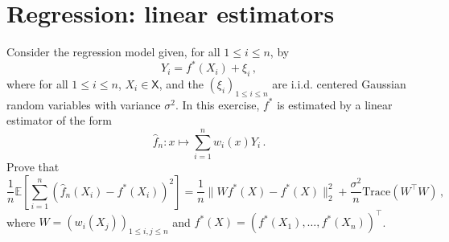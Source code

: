 \documentclass[a4paper,10pt,fleqn]{article}
\newcommand{\eqsp}{\,}
\newcommand{\xset}{\ensuremath{\mathsf{X}}}
\newcommand{\1}{\ensuremath{\mathbbm{1}}}
\newcommand{\bE}{\mathbb{E}}
\begin{document}
\section*{Regression: linear estimators}
Consider the regression model given, for all $1\leqslant i\leqslant n$, by
$$
Y_{i}=f^*(X_{i})+\xi_{i}\eqsp,
$$
where for all $1\leqslant i\leqslant n$, $X_i\in\xset$, and the $(\xi_{i})_{1\leqslant i \leqslant n}$ are i.i.d. centered Gaussian random variables with variance $\sigma^2$. In this exercise, $f^*$ is estimated by a linear estimator of the form
$$
\widehat f_n: x \mapsto \sum_{i = 1}^n w_i(x)Y_i\eqsp.
$$
Prove that
$$
\frac{1}{n}\bE\left[\sum_{i=1}^n(\widehat f_n(X_i) - f^*(X_i))^2\right] = \frac{1}{n}\|Wf^*(X) - f^*(X)\|_2^2 + \frac{\sigma^2}{n}\mathrm{Trace}(W^\top W)\eqsp, 
$$
where $W = (w_i(X_j))_{1\leqslant i,j \leqslant n}$ and $f^*(X) = (f^*(X_1),\ldots,f^*(X_n))^\top$.

%
\end{document}
